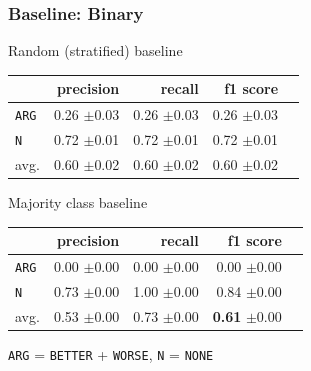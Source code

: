 \documentclass[11pt,aspectratio=169]{beamer}
\begin{document}
    \begin{frame}
        \frametitle{Baseline: Binary}


        \begin{minipage}{.5\linewidth}
            \caption{Random (stratified) baseline}
            \label{tbl:binmaj}
            \centering

            \begin{tabularx}{0.97\linewidth}{Xrrrr}
                \toprule
                & precision & recall & f1 score                              \\ \midrule
                \texttt{ARG}  & 0.26 \scriptsize{$\pm$0.03} & 0.26 \scriptsize{$\pm$0.03} & 0.26 \scriptsize{$\pm$0.03}          \\
                \texttt{N} & 0.72 \scriptsize{$\pm$0.01} & 0.72 \scriptsize{$\pm$0.01} & 0.72 \scriptsize{$\pm$0.01}          \\
                avg. & 0.60 \scriptsize{$\pm$0.02} & 0.60 \scriptsize{$\pm$0.02} & 0.60 \scriptsize{$\pm$0.02} \\
                \bottomrule
            \end{tabularx}

        \end{minipage}%
        \begin{minipage}{.5\linewidth}
            \centering
            \caption{Majority class baseline}
            \label{tbl:binstrat}
            \begin{tabularx}{0.97\linewidth}{Xrrrr}
                \toprule
                & precision & recall & f1 score                     \\ \midrule
                \texttt{ARG}  & 0.00 \scriptsize{$\pm$0.00} & 0.00 \scriptsize{$\pm$0.00} & 0.00 \scriptsize{$\pm$0.00} \\
                \texttt{N} & 0.73 \scriptsize{$\pm$0.00} & 1.00 \scriptsize{$\pm$0.00} & 0.84 \scriptsize{$\pm$0.00} \\
                avg. & 0.53 \scriptsize{$\pm$0.00} & 0.73 \scriptsize{$\pm$0.00} & \textbf{0.61} \scriptsize{$\pm$0.00} \\
                \bottomrule
            \end{tabularx}
        \end{minipage}\newline\newline
        \texttt{ARG} = \texttt{BETTER} + \texttt{WORSE}, \texttt{N} = \texttt{NONE}


    \end{frame}
\end{document}
